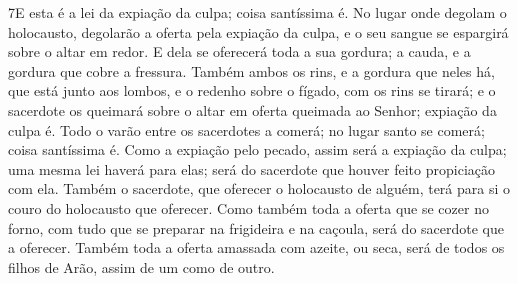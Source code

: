 \medskip

\lettrine{7} E esta é a lei da expiação da culpa; coisa
santíssima é. No lugar onde degolam o holocausto, degolarão a
oferta pela expiação da culpa, e o seu sangue se espargirá sobre o
altar em redor. E dela se oferecerá toda a sua gordura; a cauda,
e a gordura que cobre a fressura. Também ambos os rins, e a
gordura que neles há, que está junto aos lombos, e o redenho sobre o
fígado, com os rins se tirará; e o sacerdote os queimará sobre o
altar em oferta queimada ao Senhor; expiação da culpa é. Todo o
varão entre os sacerdotes a comerá; no lugar santo se comerá; coisa
santíssima é. Como a expiação pelo pecado, assim será a expiação
da culpa; uma mesma lei haverá para elas; será do sacerdote que
houver feito propiciação com ela. Também o sacerdote, que
oferecer o holocausto de alguém, terá para si o couro do holocausto
que oferecer. Como também toda a oferta que se cozer no forno,
com tudo que se preparar na frigideira e na caçoula, será do
sacerdote que a oferecer. Também toda a oferta amassada com
azeite, ou seca, será de todos os filhos de Arão, assim de um como
de outro.

